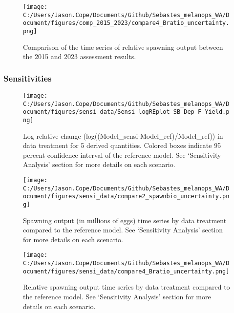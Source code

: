 \documentclass[11pt,
  english,
  letterpaper,
]{article}
\begin{document}
\pagebreak

\begin{figure}
\centering
\texttt{[image: C:/Users/Jason.Cope/Documents/Github/Sebastes\_melanops\_WA/Document/figures/comp\_2015\_2023/compare4\_Bratio\_uncertainty.png]}
\caption{Comparison of the time series of relative spawning output between the 2015 and 2023 assessment results.\label{fig:comp_depl}}
\end{figure}

\pagebreak

\hypertarget{sensitivities}{%
\subsubsection{Sensitivities}\label{sensitivities}}

\begin{figure}
\centering
\texttt{[image: C:/Users/Jason.Cope/Documents/Github/Sebastes\_melanops\_WA/Document/figures/sensi\_data/Sensi\_logREplot\_SB\_Dep\_F\_Yield.png]}
\caption{Log relative change (log((Model\_sensi-Model\_ref)/Model\_ref)) in data treatment for 5 derived quantities. Colored boxes indicate 95 percent confidence interval of the reference model. See `Sensitivity Analysis' section for more details on each scenario.\label{fig:sensi-data-RE}}
\end{figure}

\pagebreak

\begin{figure}
\centering
\texttt{[image: C:/Users/Jason.Cope/Documents/Github/Sebastes\_melanops\_WA/Document/figures/sensi\_data/compare2\_spawnbio\_uncertainty.png]}
\caption{Spawning output (in millions of eggs) time series by data treatment compared to the reference model. See `Sensitivity Analysis' section for more details on each scenario.\label{fig:sensi-data-ssb}}
\end{figure}

\pagebreak

\begin{figure}
\centering
\texttt{[image: C:/Users/Jason.Cope/Documents/Github/Sebastes\_melanops\_WA/Document/figures/sensi\_data/compare4\_Bratio\_uncertainty.png]}
\caption{Relative spawning output time series by data treatment compared to the reference model. See `Sensitivity Analysis' section for more details on each scenario.\label{fig:sensi-data-depl}}
\end{figure}
\end{document}
